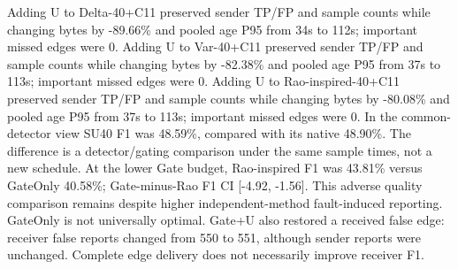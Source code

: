 Adding U to Delta-40+C11 preserved sender TP/FP and sample counts while changing bytes by -89.66\% and pooled age P95 from 34s to 112s; important missed edges were 0. Adding U to Var-40+C11 preserved sender TP/FP and sample counts while changing bytes by -82.38\% and pooled age P95 from 37s to 113s; important missed edges were 0. Adding U to Rao-inspired-40+C11 preserved sender TP/FP and sample counts while changing bytes by -80.08\% and pooled age P95 from 37s to 113s; important missed edges were 0. In the common-detector view SU40 F1 was 48.59\%, compared with its native 48.90\%. The difference is a detector/gating comparison under the same sample times, not a new schedule. At the lower Gate budget, Rao-inspired F1 was 43.81\% versus GateOnly 40.58\%; Gate-minus-Rao F1 CI [-4.92, -1.56]. This adverse quality comparison remains despite higher independent-method fault-induced reporting. GateOnly is not universally optimal.  Gate+U also restored a received false edge: receiver false reports changed from 550 to 551, although sender reports were unchanged. Complete edge delivery does not necessarily improve receiver F1.
